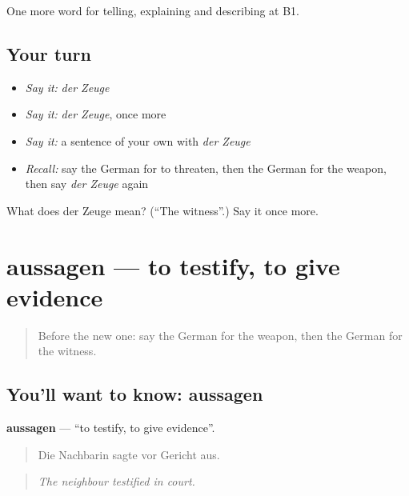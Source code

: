 \begin{grammarlens}[title={What you've built}]
One more word for telling, explaining and describing at B1.
\end{grammarlens}

\subsection*{Your turn}
\begin{itemize}
\raggedright
  \item \emph{Say it:} \emph{der Zeuge}
  \item \emph{Say it:} \emph{der Zeuge}, once more
  \item \emph{Say it:} a sentence of your own with \emph{der Zeuge}
  \item \emph{Recall:} say the German for to threaten, then the German for the weapon, then say \emph{der Zeuge} again
\end{itemize}

\begin{tcolorbox}[breakable,colback=teal!4,colframe=teal!35!black,title={Before you move on}]
What does der Zeuge mean? (\textquotedblleft{}The witness\textquotedblright{}.) Say it once more.
\end{tcolorbox}
\section[aussagen]{aussagen — to testify, to give evidence}

\label{lesson:GE-C283-aussagen}



\begin{quote}
Before the new one: say the German for the weapon, then the German for the witness.
\end{quote}

\subsection*{You'll want to know: aussagen}
\textbf{aussagen} — \textquotedblleft{}to testify, to give evidence\textquotedblright{}.

\begin{quote}
Die Nachbarin sagte vor Gericht aus.
\end{quote}

\begin{quote}
\emph{The neighbour testified in court.}
\end{quote}

